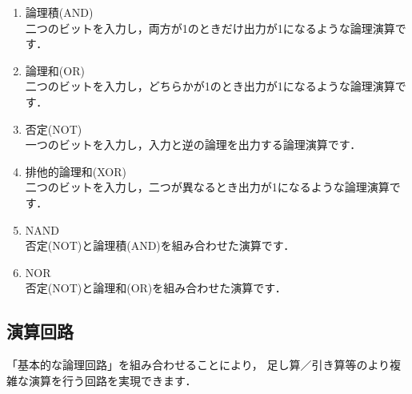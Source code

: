 \begin{enumerate}
\item 論理積(AND) \\
二つのビットを入力し，両方が1のときだけ出力が1になるような論理演算です．
\begin{center}
\epsfxsize=6.5cm
\end{center}

\item 論理和(OR) \\
二つのビットを入力し，どちらかが1のとき出力が1になるような論理演算です．
\begin{center}
\epsfxsize=6.5cm
\end{center}

\item 否定(NOT) \\
一つのビットを入力し，入力と逆の論理を出力する論理演算です．
\begin{center}
\epsfxsize=6.5cm
\end{center}

\item 排他的論理和(XOR) \\
二つのビットを入力し，二つが異なるとき出力が1になるような論理演算です．
\begin{center}
\epsfxsize=6.5cm
\end{center}

\item NAND \\
否定(NOT)と論理積(AND)を組み合わせた演算です．
\begin{center}
\epsfxsize=6.5cm
\end{center}

\item NOR \\
否定(NOT)と論理和(OR)を組み合わせた演算です．
\begin{center}
\epsfxsize=6.5cm
\end{center}

\end{enumerate}

\subsection{演算回路}

「基本的な論理回路」を組み合わせることにより，
足し算／引き算等のより複雑な演算を行う回路を実現できます．

